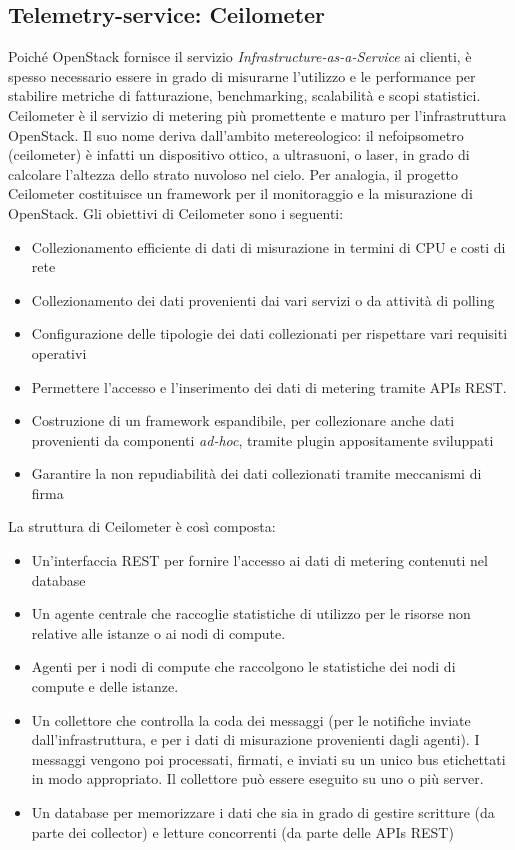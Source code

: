 \subsection{Telemetry-service: Ceilometer}
Poiché OpenStack fornisce il servizio \textit{Infrastructure-as-a-Service} ai clienti, è spesso necessario essere in grado di misurarne l'utilizzo e le performance per stabilire metriche di fatturazione, benchmarking, scalabilità e scopi statistici.
Ceilometer è il servizio di metering più promettente e maturo per l'infrastruttura OpenStack. 
Il suo nome deriva dall'ambito metereologico: il nefoipsometro (ceilometer) è infatti un dispositivo ottico, a ultrasuoni, o laser, in grado di calcolare l'altezza dello strato nuvoloso nel cielo.
Per analogia, il progetto Ceilometer costituisce un framework per il monitoraggio e la misurazione di OpenStack.
Gli obiettivi di Ceilometer sono i seguenti:
\begin{itemize}
\item Collezionamento efficiente di dati di misurazione in termini di CPU e costi di rete
\item Collezionamento dei dati provenienti dai vari servizi o da attività  di polling
\item Configurazione delle tipologie dei dati collezionati per rispettare vari requisiti operativi
\item Permettere l'accesso e l'inserimento dei dati di metering tramite APIs REST.
\item Costruzione di un framework espandibile, per collezionare anche dati provenienti da componenti \textit{ad-hoc}, tramite plugin appositamente sviluppati
\item Garantire la non repudiabilità dei dati collezionati tramite meccanismi di firma
\end{itemize}
La struttura di Ceilometer è così composta:
\begin{itemize}
\item Un'interfaccia REST per fornire l'accesso ai dati di metering contenuti nel database
\item Un agente centrale che raccoglie statistiche di utilizzo per le risorse non relative alle istanze o ai nodi di compute.
\item Agenti per i nodi di compute che raccolgono le statistiche dei nodi di compute e delle istanze.
\item Un collettore che controlla la coda dei messaggi (per le notifiche inviate dall'infrastruttura, e per i dati di misurazione provenienti dagli agenti).  I messaggi vengono poi processati, firmati, e inviati su un unico bus etichettati in modo appropriato. Il collettore può essere eseguito su uno o più server.
\item Un database per memorizzare i dati che sia in grado di gestire scritture (da parte dei collector) e letture concorrenti (da parte delle APIs REST)
\end{itemize}

